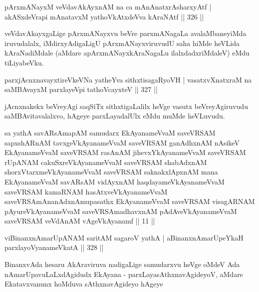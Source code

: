 \begin{shl}
pArxmANayxM veVdavAkAyxnAM na ca mAnAnatxrAsharxyAtf |
akASxdeVrapi mAnatavxM yathoVkAtxdeVva kAraNAtf \hfill || 326 ||
\end{shl}

\begin{artha}
veVdavAkayxgaLige pArxmANayxvu beVre parxmANagaLa avalaMbaneyiMda iruvudalalx, iMdirxyAdigaLigU pArxmANayxviruvudU saha hiMde heVLida kAraNadiMdale (aMdare apArxmANayxkAraNagaLu ilalxdadxriMdaleV) eMdu tiLiyabeVku.
\end{artha}


\begin{shl}
parxjAcnxnavayxtireVkeVNa yatheYva sithxtisagaRyoVH |
vasatxvXnatxraM na saMBAvayxM parxlayeV\s pi tathoVcayxteV \hfill || 327 ||
\end{shl}

\begin{artha}
jAcnxnakekx beVreyAgi saqSiTx sithxtigaLalilx heVge vasutx beVreyAgiruvudu saMBAvitavalalxvo, hAgeye parxLayadalUlx eMdu muMde heVLuvudu.
\end{artha}


\begin{shl}
sa yathA savARsAmapAM samudarx EkAyanameVvaM saveVRSAM sapxshARnAM tavxgeVkAyanameVvaM saveVRSAM ganAdhxnAM nAsikeV EkAyanameVvaM saveVRSAM rasAnAM jihevxYkAyanameVvaM saveVRSAM rUpANAM cakuSxreVkAyanameVvaM saveVRSAM shabAdxnAM shorxVtarxmeVkAyanameVvaM saveVRSAM saknakxlApxnAM mana EkAyanameVvaM savARsAM vidAyxnAM haqdayameVkAyanameVvaM saveVRSAM kamaRNAM hasAtxveVkAyanameVvaM saveVRSAmAnanAdxnAmupasathx EkAyanameVvaM saveVRSAM visagARNAM pAyureVkAyanameVvaM saveVRSAmadhavxnAM pAdAveVkAyanameVvaM saveVRSAM veVdAnAM vAgeVkAyanamf || 11 || 
\end{shl}

\begin{shl}
viBinanxnAmarUpANAM saritAM sagaroV yathA |
aBinanxnAmarUpeYkaH parxlayoV\s yanameVkatA \hfill || 328 ||
\end{shl}

\begin{artha}
BinanxvAda hesaru AkAraviruva nadigaLige samudarxvu heVge oMdeV Ada nAmarUpavuLaLxdAgidudx EkAyana - parxLayasAthxnavAgideyoV, aMdare Ekatavxvanunx hoMduva sAthxnavAgideyo hAgeye
\end{artha}


